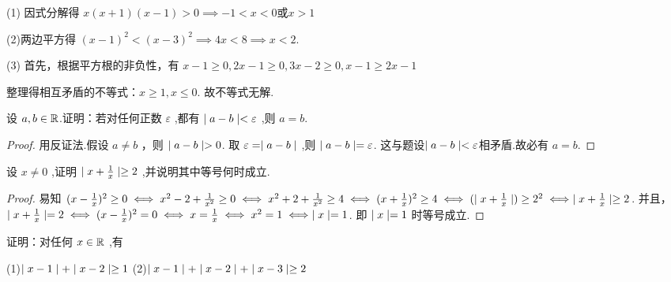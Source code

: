 \begin{solve}
    (1) 因式分解得 $x(x+1)(x-1)>0 \implies -1<x<0 \mbox{或} x>1$
    
    {\vspace{0.1cm}\hfill{}\hfill}

    (2)两边平方得 $(x-1)^2<(x-3)^2 \implies 4x<8 \implies x<2$.

    {\vspace{0.1cm}\hfill{}\hfill}

    (3) 首先，根据平方根的非负性，有 $x-1\ge 0,2x-1\ge 0,3x-2\ge 0,x-1\ge 2x-1$

    整理得相互矛盾的不等式：$x\ge 1,x\le 0$. 故不等式无解.
\end{solve}

\begin{practice}
    设 $a,b\in \mathbb{R}$.证明：若对任何正数 $\varepsilon$ ,都有 $\mid a-b \mid<\varepsilon$ ,则 $a=b$.
\end{practice}

\begin{proof}
    用反证法.假设 $a\ne b$ ，则 $\mid a-b \mid>0$. 取 $\varepsilon = \mid a-b \mid$ ,则 $\mid a-b \mid=\varepsilon$. 这与题设$\mid a-b \mid<\varepsilon$相矛盾.故必有 $a=b$.
\end{proof}

\begin{practice}
    设 $x\ne 0$ ,证明 $\mid x+\frac{1}{x} \mid\ge 2$ ,并说明其中等号何时成立.
\end{practice}

\begin{proof}
    易知 $(x-\frac{1}{x})^2\ge 0 \iff x^2-2+\frac{1}{x^2}\ge 0 \iff x^2+2+\frac{1}{x^2} \ge 4 \iff (x+\frac{1}{x})^2\ge 4 \iff (\mid x+\frac{1}{x} \mid) \ge 2^2 \iff \mid x+\frac{1}{x} \mid\ge 2$. 并且， $\mid x+\frac{1}{x} \mid= 2 \iff (x-\frac{1}{x})^2= 0\iff x=\frac{1}{x} \iff x^2=1 \iff \mid x \mid=1$. 即 $\mid x \mid=1$ 时等号成立.
\end{proof}

\begin{practice}
    证明：对任何 $x\in \mathbb{R}$ ,有

    (1)$\mid x-1 \mid + \mid x-2 \mid \ge 1$ \quad (2)$\mid x-1 \mid + \mid x-2 \mid + \mid x-3 \mid \ge 2$
\end{practice}

